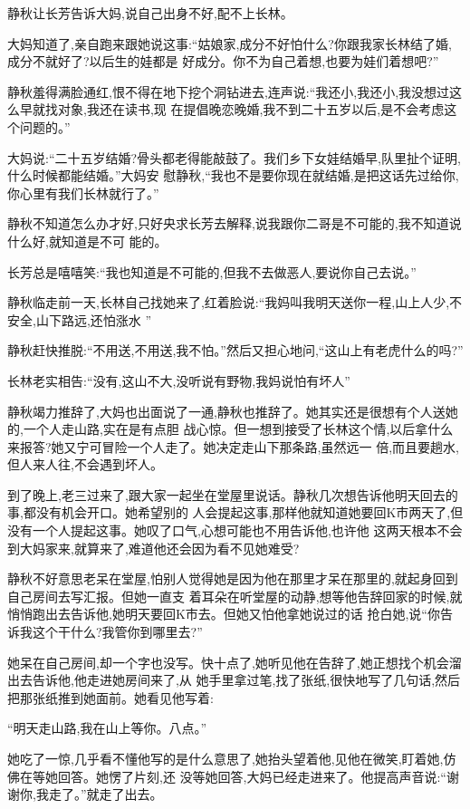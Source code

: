 ﻿\documentclass[12pt]{article}
\begin{document}
静秋让长芳告诉大妈,说自己出身不好,配不上长林。

大妈知道了,亲自跑来跟她说这事:``姑娘家,成分不好怕什么?你跟我家长林结了婚,成分不就好了?以后生的娃都是
好成分。你不为自己着想,也要为娃们着想吧?''

静秋羞得满脸通红,恨不得在地下挖个洞钻进去,连声说:``我还小,我还小,我没想过这么早就找对象,我还在读书,现
在提倡晚恋晚婚,我不到二十五岁以后,是不会考虑这个问题的。''

大妈说:``二十五岁结婚?骨头都老得能敲鼓了。我们乡下女娃结婚早,队里扯个证明,什么时候都能结婚。''大妈安
慰静秋,``我也不是要你现在就结婚,是把这话先过给你,你心里有我们长林就行了。''

静秋不知道怎么办才好,只好央求长芳去解释,说我跟你二哥是不可能的,我\myrule 不知道说什么好,就知道是不可
能的。

长芳总是嘻嘻笑:``我也知道是不可能的,但我不去做恶人,要说你自己去说。''

静秋临走前一天,长林自己找她来了,红着脸说:``我妈叫我明天送你一程,山上人少,不安全,山下路远,还怕涨水
\myrule ''

静秋赶快推脱:``不用送,不用送,我\myrule 不怕。''然后又担心地问,``这山上有\myrule 老虎什么的吗?''

长林老实相告:``没有,这山不大,没听说有野物,我妈说怕有\myrule 坏人\myrule ''

静秋竭力推辞了,大妈也出面说了一通,静秋也推辞了。她其实还是很想有个人送她的,一个人走山路,实在是有点胆
战心惊。但一想到接受了长林这个情,以后拿什么来报答?她又宁可冒险一个人走了。她决定走山下那条路,虽然远一
倍,而且要趟水,但人来人往,不会遇到坏人。

到了晚上,老三过来了,跟大家一起坐在堂屋里说话。静秋几次想告诉他明天回去的事,都没有机会开口。她希望别的
人会提起这事,那样他就知道她要回K市两天了,但没有一个人提起这事。她叹了口气,心想可能也不用告诉他,也许他
这两天根本不会到大妈家来,就算来了,难道他还会因为看不见她难受?

静秋不好意思老呆在堂屋,怕别人觉得她是因为他在那里才呆在那里的,就起身回到自己房间去写汇报。但她一直支
着耳朵在听堂屋的动静,想等他告辞回家的时候,就悄悄跑出去告诉他,她明天要回K市去。但她又怕他拿她说过的话
抢白她,说``你告诉我这个干什么?我管你到哪里去?''

她呆在自己房间,却一个字也没写。快十点了,她听见他在告辞了,她正想找个机会溜出去告诉他,他走进她房间来了,从
她手里拿过笔,找了张纸,很快地写了几句话,然后把那张纸推到她面前。她看见他写着:

``明天走山路,我在山上等你。八点。''

她吃了一惊,几乎看不懂他写的是什么意思了,她抬头望着他,见他在微笑,盯着她,仿佛在等她回答。她愣了片刻,还
没等她回答,大妈已经走进来了。他提高声音说:``谢谢你,我走了。''就走了出去。
\end{document}
